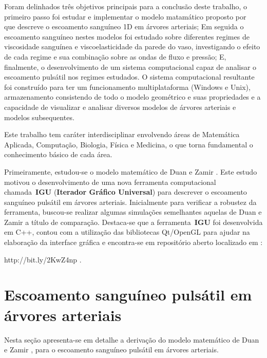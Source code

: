 \documentclass[
        english,			
        brazil			        %
        ,<...>]{abntbibufjf}
\begin{document}
Foram delinhados três objetivos principais para a conclusão deste trabalho, o primeiro passo foi estudar e implementar o modelo matamático proposto por~\cite{Duan} que descreve o escoamento sanguíneo 1D em árvores arteriais; Em seguida o escoamento sanguíneo nestes modelos foi estudado sobre diferentes regimes de viscosidade sanguínea e viscoelasticidade da parede do vaso, investigando o efeito de cada regime e sua combinação sobre as ondas de fluxo e pressão; E, finalmente, o desenvolvimento de um sistema computacional capaz de analisar o escoamento pulsátil nos regimes estudados. O sistema computacional resultante foi construído para ter um funcionamento multiplataforma (Windows e Unix), armazenamento consistendo de todo o modelo geométrico e suas propriedades e a capacidade de visualizar e analisar diversos modelos de árvores arteriais e modelos subsequentes.

Este trabalho tem caráter interdisciplinar envolvendo áreas de Matemática Aplicada,
Computação, Biologia, Física e Medicina, o que torna fundamental o conhecimento
básico de cada área.

Primeiramente, estudou-se o modelo matemático de Duan e Zamir \cite{Duan}. Este estudo motivou o desenvolvimento de uma nova ferramenta computacional chamada~\textbf{IGU} (\textbf{Iterador Gráfico Universal}) para descrever o escoamento sanguíneo pulsátil em árvores arteriais. Inicialmente para verificar a robustez da ferramenta, buscou-se realizar algumas simulações semelhantes aquelas de Duan e Zamir a título de comparação. Destaca-se que a ferramenta~\textbf{IGU} foi desenvolvida em C++,  contou com a utilização das bibliotecas Qt/OpenGL para ajudar na elaboração da interface gráfica e encontra-se em repositório aberto localizado em :

	http://bit.ly/2KwZ4np .


\chapter{Escoamento sanguíneo pulsátil em árvores arteriais}\label{sec:escoamento}

Nesta seção apresenta-se em detalhe a derivação do modelo matemático de Duan e Zamir \cite{Duan}, para o escoamento sanguíneo pulsátil em árvores arteriais.
\end{document}
